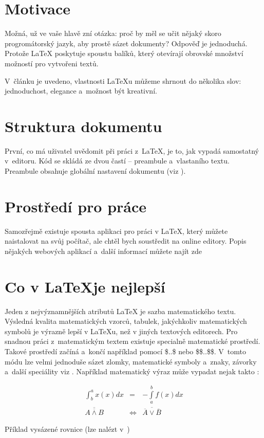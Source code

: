 \documentclass[11pt,a4paper]{article}
\begin{document}
\section{Motivace}
Možná, už ve vaše hlavě zní otázka: proč by měl se učit nějaký skoro progromátorský jazyk, aby prostě sázet dokumenty? Odpověď je jednoduchá. Protože {\LaTeX} poskytuje spoustu balíků, který otevírají obrovské množství možností pro vytvořeni textů. 

V~článku \cite{Simecek} je uvedeno, vlastnosti {\LaTeX}u můžeme shrnout do několika slov: jednoduchost, elegance a~možnost být kreativní.

\section{Struktura dokumentu}
První, co má uživatel uvědomit při práci z~{\LaTeX}, je to, jak vypadá samostatný  v~editoru. Kód se skládá ze dvou častí --  preambule a~vlastaního textu. Preambule obsahuje globální nastavení dokumentu (viz  \cite{Svamberg}).

\section{Prostředí pro práce}
Samozřejmě existuje spousta aplikaci pro práci v {\LaTeX}, který můžete naistalovat na svůj počítač, ale chtěl bych soustředit na online editory. Popis nějakých webových aplikací a~další informací můžete najít zde \cite{Sokol} 

\section{Co v \LaTeX je nejlepší}
Jeden z nejvýznamnějších atributů {\LaTeX} je sazba matematického textu. Výsledná kvalita matematických vzorců, tabulek, jakýchkoliv matematických symbolů je výrazně lepší v {\LaTeX}u, než v jiných textových editorech. Pro snadnou práci z~matematickým textem existuje specialně matematické prostředí. Takové prostředí začíná a~končí například pomocí \$..\$ nebo \$\$..\$\$. V~tomto módu lze velmi jednoduše sázet zlomky, matematické symboly a~znaky, závorky a~další speciálity viz \cite{Olsak}. Například matematický výraz může vypadat nejak takto :

\begin{eqnarray}
    \int_{b}^{a} x(x) dx & = & -\int\limits_{a}^{b} f(x) dx\\
     \overline{\overline{A \wedge B}} & \Leftrightarrow & \overline{\overline{A} \vee \overline{B}}
\end{eqnarray}

Příklad vysázené rovnice (lze nalézt v~\cite{CazarezCastro})
		
 


\newpage
	
	\renewcommand{\refname}{Literatura}
	
\end{document}
